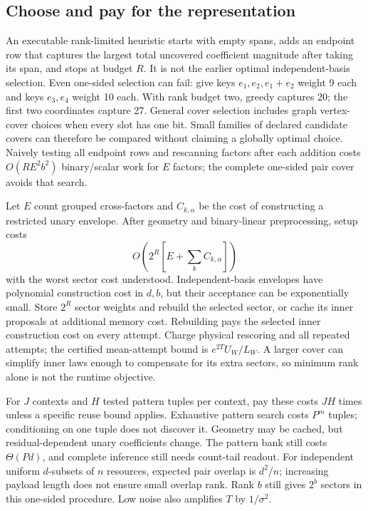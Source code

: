 \documentclass[10pt,a4paper]{article}
\begin{document}
\subsection{Choose and pay for the representation}
An executable rank-limited heuristic starts with empty spans, adds an endpoint row that captures the
largest total uncovered coefficient magnitude after taking its span, and stops at budget $R$.
It is not the earlier optimal independent-basis selection. Even one-sided selection can fail:
give keys $e_1,e_2,e_1+e_2$ weight 9 each and keys $e_3,e_4$ weight 10 each. With rank budget two,
greedy captures 20; the first two coordinates capture 27. General cover selection includes graph
vertex-cover choices when every slot has one bit. Small families of declared candidate covers can
therefore be compared without claiming a globally optimal choice.
Naively testing all endpoint rows and rescanning factors after each addition costs
$O(RE^2b^2)$ binary/scalar work for $E$ factors; the complete one-sided pair cover avoids that search.

Let $E$ count grouped cross-factors and $C_{k,\alpha}$ be the cost of constructing a restricted unary
envelope. After geometry and binary-linear preprocessing, setup costs
\[
 O\!\left(2^R\left[E+\sum_kC_{k,\alpha}\right]\right)
\]
with the worst sector cost understood. Independent-basis envelopes have polynomial construction
cost in $d,b$, but their acceptance can be exponentially small. Store $2^R$ sector weights and
rebuild the selected sector, or cache its inner proposals at additional memory cost. Rebuilding pays
the selected inner construction cost on every attempt. Charge physical
rescoring and all repeated attempts; the certified mean-attempt bound is $e^{2T}U_W/L_W$.
A larger cover can simplify inner laws enough to compensate for its extra sectors, so minimum rank
alone is not the runtime objective.

For $J$ contexts and $H$ tested pattern tuples per context, pay these costs $JH$ times unless a
specific reuse bound applies. Exhaustive pattern search costs $P^m$ tuples; conditioning on one
tuple does not discover it. Geometry may be cached, but residual-dependent unary coefficients change.
The pattern bank still costs $\Theta(Pd)$, and complete inference still needs count-tail readout.
For independent uniform $d$-subsets of $n$ resources, expected pair overlap is $d^2/n$; increasing
payload length does not ensure small overlap rank. Rank $b$ still gives $2^b$ sectors in this
one-sided procedure. Low noise also amplifies $T$ by $1/\sigma^2$.
\end{document}
